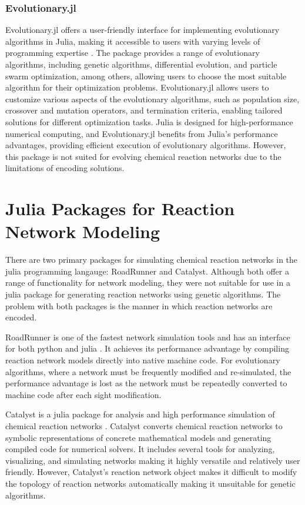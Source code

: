 \documentclass[12pt]{report}
\begin{document}
\subsubsection{Evolutionary.jl}
Evolutionary.jl offers a user-friendly interface for implementing evolutionary algorithms in Julia, making it accessible to users with varying levels of programming expertise \cite{evolutionary.jl}. The package provides a range of evolutionary algorithms, including genetic algorithms, differential evolution, and particle swarm optimization, among others, allowing users to choose the most suitable algorithm for their optimization problems. Evolutionary.jl allows users to customize various aspects of the evolutionary algorithms, such as population size, crossover and mutation operators, and termination criteria, enabling tailored solutions for different optimization tasks. Julia is designed for high-performance numerical computing, and Evolutionary.jl benefits from Julia's performance advantages, providing efficient execution of evolutionary algorithms. However, this package is not suited for evolving chemical reaction networks due to the limitations of encoding solutions.

\section{Julia Packages for Reaction Network Modeling}
\label{section:tools_networks}
There are two primary packages for simulating chemical reaction networks in the julia programming langauge: RoadRunner and Catalyst. Although both offer a range of functionality for network modeling, they were not suitable for use in a julia package for generating reaction networks using genetic algorithms. The problem with both packages is the manner in which reaction networks are encoded.

RoadRunner is one of the fastest network simulation tools and has an interface for both python and julia \cite{Welsh2022}. It achieves its performance advantage by compiling reaction network models directly into native machine code. For evolutionary algorithms, where a network must be frequently modified and re-simulated, the performance advantage is lost as the network must be repeatedly converted to machine code after each sight modification.

Catalyst is a julia package for analysis and high performance simulation of chemical reaction networks \cite{Loman2023}. Catalyst converts chemical reaction networks to symbolic representations of concrete mathematical models and generating compiled code for numerical solvers. It includes several tools for analyzing, visualizing, and simulating networks making it highly versatile and relatively user friendly. However, Catalyst's reaction network object makes it difficult to modify the topology of reaction networks automatically making it unsuitable for genetic algorithms. 
\end{document}
